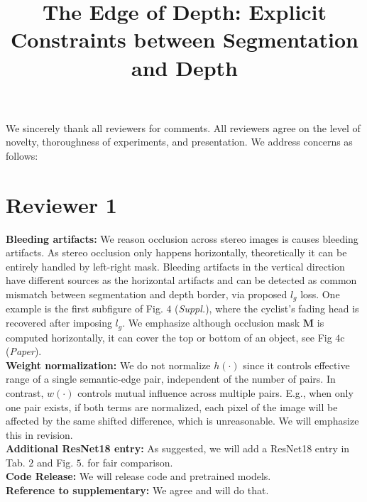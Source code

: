 \documentclass[10pt,twocolumn,letterpaper]{article}
\begin{document}
\title{The Edge of Depth: Explicit Constraints between Segmentation and Depth}  %

\maketitle
\thispagestyle{empty}


\noindent We sincerely thank all reviewers for comments.
All reviewers agree on the level of novelty, thoroughness of experiments, and presentation.
We address concerns as follows:
\vspace{-3.5mm}
\section*{Reviewer 1}
\vspace{-1.5mm}
\noindent\textbf{Bleeding artifacts:} 
We reason occlusion across stereo images is causes bleeding artifacts. As stereo occlusion only happens horizontally, theoretically it can be entirely handled by left-right mask. 
Bleeding artifacts in the vertical direction have different sources as the horizontal artifacts and can be detected as common mismatch between segmentation and depth border, via proposed $l_g$ loss. 
One example is the first subfigure of Fig. $4$ (\textit{Suppl.}), where the cyclist's fading head is recovered after imposing $l_g$. 
We emphasize  although occlusion mask $\mathbf{M}$ is computed horizontally, it can cover the top or bottom of an object, see Fig $4$c (\textit{Paper}).\\
\noindent\textbf{Weight normalization:} 
We do not normalize $h(\cdot)$ since it controls effective range of a single semantic-edge pair, independent of the number of pairs. 
In contrast, $w(\cdot)$ controls mutual influence across multiple pairs. 
E.g., when only one pair exists, if both terms are normalized, each pixel of the image will be affected by the same shifted difference, which is unreasonable. 
We will emphasize this in revision. 
\\
\noindent\textbf{Additional ResNet18 entry:} 
As suggested, we will add a ResNet18 entry in Tab. $2$ and Fig. $5$. for fair comparison. \\
\noindent\textbf{Code Release:} We will release code and pretrained models.\\
\noindent\textbf{Reference to supplementary:} 
We agree and will do that.
\end{document}
